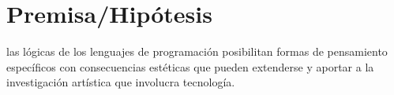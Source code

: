\section*{Premisa/Hipótesis}

las lógicas de los lenguajes de programación posibilitan formas de pensamiento específicos con consecuencias estéticas que pueden extenderse y aportar a la investigación artística que involucra tecnología.

